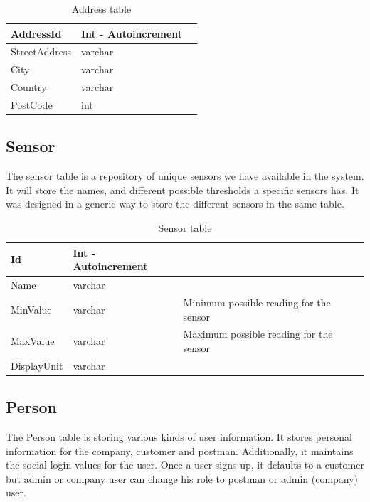 \begin{table}[!ht]
	\centering
	\begin{tabular}{ |l|l|l| }
		\hline
		AddressId  & Int - Autoincrement & \\
		\hline
		StreetAddress  & varchar & \\
		\hline
		City  & varchar &\\
		\hline
		Country  & varchar &\\
		\hline
		PostCode  & int &\\
		\hline
	\end{tabular}
	\caption{Address table}
\end{table}



\subsection{Sensor}
The sensor table is a repository of unique sensors we have available in the system. It will store the names, and different possible thresholds a specific sensors has. It was designed in a generic way to store the different sensors in the same table. 




\begin{table}[!ht]
	\small
	\centering
	\begin{tabular}{ |l|l|l| }
		\hline
		Id  & Int - Autoincrement  & \\
		\hline
		Name  & varchar & \\
		\hline
		MinValue & varchar & Minimum possible reading for the sensor  \\
		\hline
		MaxValue & varchar & Maximum possible reading for the sensor\\
		\hline
		DisplayUnit  & varchar & \\
		\hline
	\end{tabular}
	\caption{Sensor table}
\end{table}


\subsection{Person}
The Person table is storing various kinds of user information. It stores personal information for the company, customer and postman. Additionally, it maintains the social login values for the user. Once a user signs up, it defaults to a customer but admin or company user can change his role to postman or admin (company) user. 

